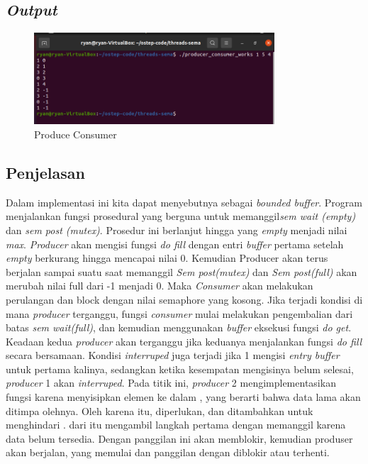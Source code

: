 \documentclass[11pt,a4paper]{article}
\begin{document}
   \subsection{\textit{Output}}
    \begin{figure}[h]
	\centering
	\includegraphics[width=0.8\textwidth]{Figure/producer_consumer_works.png}
	\caption{Produce Consumer}
    \end{figure}
    
\subsection{Penjelasan}
    Dalam implementasi ini kita dapat menyebutnya sebagai \textit{bounded buffer}. Program menjalankan fungsi prosedural yang berguna untuk memanggil\textit{sem wait (empty)} dan \textit{sem post (mutex)}. Prosedur ini berlanjut hingga yang \textit{empty} menjadi nilai \textit{max}. \textit{Producer} akan mengisi fungsi \textit{do fill} dengan entri \textit{buffer} pertama  setelah \textit{empty} berkurang hingga mencapai nilai 0. Kemudian Producer akan terus berjalan sampai suatu saat  memanggil \textit{Sem post(mutex)} dan \textit{Sem post(full)}  akan merubah nilai  full dari  -1 menjadi 0. Maka \textit{Consumer} akan melakukan perulangan dan block dengan nilai semaphore yang kosong. Jika terjadi kondisi di mana \textit{producer} terganggu, fungsi \textit{consumer} mulai melakukan pengembalian dari batas  \textit{sem wait(full)}, dan kemudian menggunakan \textit{buffer} eksekusi fungsi \textit{do get}. Keadaan kedua \textit{producer} akan terganggu jika keduanya menjalankan fungsi \textit{do fill} secara bersamaan. Kondisi \textit{interruped} juga terjadi jika  1 mengisi \textit{entry buffer} untuk pertama kalinya, sedangkan ketika kesempatan mengisinya belum selesai, \textit{producer} 1 akan \textit{interruped}. Pada titik ini, \textit{producer} 2 mengimplementasikan fungsi  karena menyisipkan elemen ke dalam , yang berarti bahwa data lama akan ditimpa olehnya. Oleh karena itu,   diperlukan, dan  ditambahkan untuk menghindari . dari itu  mengambil langkah pertama dengan memanggil  karena data belum tersedia. Dengan panggilan ini  akan memblokir, kemudian produser akan berjalan, yang memulai  dan panggilan  dengan  diblokir atau terhenti.
\end{document}
